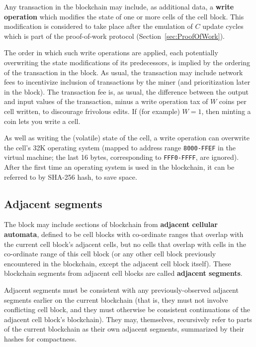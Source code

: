 \documentclass{article}
\newcommand\hex[1]{{\tt #1}}
\newcommand\hexrange[2]{\hex{#1}{\tt -}\hex{#2}}
\begin{document}
Any transaction in the blockchain may include, as additional data,
a {\bf write operation} which modifies the state of one or more cells of the cell block.
This modification is considered to take place after the emulation of $C$ update cycles
which is part of the proof-of-work protocol (Section~\ref{sec:ProofOfWork}).

The order in which such write operations are applied,
each potentially overwriting the state modifications of its predecessors,
is implied by the ordering of the transaction in the block.
As usual, the transaction may include network fees to incentivize inclusion of transactions
by the miner
(and prioritization later in the block).
The transaction fee is, as usual, the difference between the output and input values of the transaction,
minus a write operation tax of $W$ coins per cell written,
to discourage frivolous edits.
If (for example) $W=1$, then minting a coin lets you write a cell.

As well as writing the (volatile) state of the cell, a write operation can overwrite the cell's 32K operating system
(mapped to address range \hexrange{8000}{FFEF} in the virtual machine; the last 16 bytes, corresponding to \hexrange{FFF0}{FFFF}, are ignored).
After the first time an operating system is used in the blockchain, it can be referred to by SHA-256 hash, to save space.

\subsection{Adjacent segments}

The block may include sections of blockchain from {\bf adjacent cellular automata},
defined to be cell blocks with co-ordinate ranges that
overlap with the current cell block's adjacent cells,
but no cells that overlap with
cells in the co-ordinate range of this cell block (or any other cell block previously encountered in the blockchain,
except the adjacent cell block itself).
These blockchain segments from adjacent cell blocks are called {\bf adjacent segments}.

Adjacent segments must be consistent with any previously-observed adjacent segments
earlier on the current blockchain (that is, they must not involve conflicting cell block,
and they must otherwise be consistent continuations of the adjacent cell block's blockchain).
They may, themselves, recursively refer to parts of the current blockchain as their own adjacent segments,
summarized by their hashes for compactness.
\end{document}
